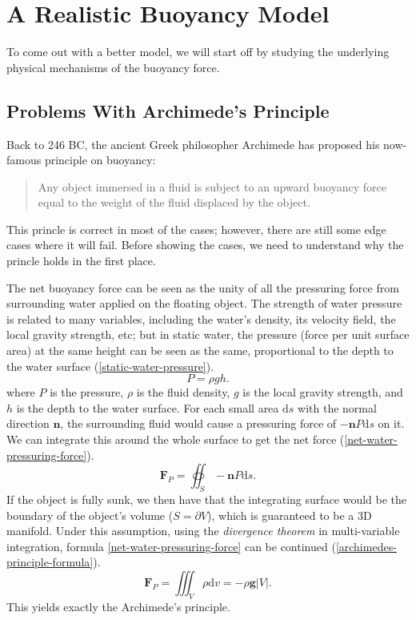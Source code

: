 \section{A Realistic Buoyancy Model}

To come out with a better model, we will start off by studying the underlying physical mechanisms of the buoyancy force.

\subsection{Problems With Archimede's Principle}

Back to 246 BC, the ancient Greek philosopher Archimede has proposed his now-famous principle on buoyancy:
\begin{quote}
	Any object immersed in a fluid is subject to an upward buoyancy force equal to the weight of the fluid displaced by the object.
\end{quote}
This princle is correct in most of the cases;
however, there are still some edge cases where it will fail.
Before showing the cases, we need to understand why the princle holds in the first place.

The net buoyancy force can be seen as the unity of all the pressuring force from surrounding water applied on the floating object.
The strength of water pressure is related to many variables, including the water's density, its velocity field, the local gravity strength, etc;
but in static water, the pressure (force per unit surface area) at the same height can be seen as the same, proportional to the depth to the water surface (\ref{static-water-pressure}).
\begin{equation}
	P=\rho gh.
	\label{static-water-pressure}
\end{equation}
where $P$ is the pressure, $\rho$ is the fluid density, $g$ is the local gravity strength, and $h$ is the depth to the water surface.
For each small area $\mathrm{d}s$ with the normal direction $\mathbf n$, the surrounding fluid would cause a pressuring force of $-\mathbf nP\mathrm{d}s$ on it.
We can integrate this around the whole surface to get the net force (\ref{net-water-pressuring-force}).
\begin{equation}
	\mathbf{F}_P=\oiint_{S}-\mathbf nP\mathrm{d}s.
	\label{net-water-pressuring-force}
\end{equation}
If the object is fully sunk, we then have that the integrating surface would be the boundary of the object's volume ($S=\partial V$), which is guaranteed to be a 3D manifold.
Under this assumption, using the \emph{divergence theorem} in multi-variable integration, formula \ref{net-water-pressuring-force} can be continued (\ref{archimedes-principle-formula}).
\begin{equation}
	\mathbf{F}_P=\iiint_{V}\rho\mathrm{d}v=-\rho\mathbf{g}|V|.
	\label{archimedes-principle-formula}
\end{equation}
This yields exactly the Archimede's principle.

